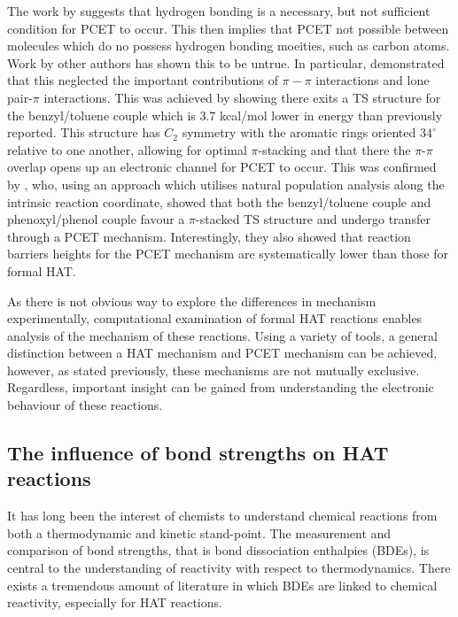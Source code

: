 

The work by \citet{Mayer2002} suggests that hydrogen bonding is a necessary, but
not sufficient condition for PCET to occur. This then implies that PCET not
possible between molecules which do no possess hydrogen bonding moeities, such
as carbon atoms. Work by other authors has shown this to be
untrue.\cite{Hatcher2007,DiLabio2007} In particular, \citet{DiLabio2007}
demonstrated that this neglected the important contributions of $\pi-\pi$
interactions and lone pair-$\pi$ interactions. This was achieved by showing
there exits a TS structure for the benzyl/toluene couple which is 3.7 kcal/mol
lower in energy than previously reported. This structure has $C_2$ symmetry
with the aromatic rings oriented $34^\circ$ relative to one another, allowing
for optimal $\pi$-stacking and that there the $\pi$-$\pi$ overlap opens up an
electronic channel for PCET to occur. This was confirmed by
\citet{Munoz-Rugeles2017}, who, using an approach which utilises natural
population analysis along the intrinsic reaction coordinate, showed that both the
benzyl/toluene couple and phenoxyl/phenol couple favour a $\pi$-stacked TS
structure and undergo transfer through a PCET mechanism.
Interestingly, they also showed that reaction barriers heights for the PCET
mechanism are systematically lower than those for formal HAT.

As there is not obvious way to explore the differences in mechanism
experimentally, computational examination of formal HAT reactions enables
analysis of the mechanism of these reactions. Using a variety of tools, a
general distinction between a HAT mechanism and PCET mechanism can be achieved,
however, as stated previously, these mechanisms are not mutually
exclusive. Regardless, important insight can be gained from understanding the
electronic behaviour of these reactions.


\subsection{The influence of bond strengths on HAT reactions}

It has long been the interest of chemists to understand chemical reactions from
both a thermodynamic and kinetic stand-point. The measurement and comparison of
bond strengths, that is bond dissociation enthalpies (BDEs), is central to the
understanding of reactivity with respect to thermodynamics. There exists a
tremendous amount of literature in which BDEs are linked to chemical reactivity,
especially for HAT
reactions.\cite{Kochi1973,Tedder1982,Wijtmans2003,Pratt2004,Mayer2004}

